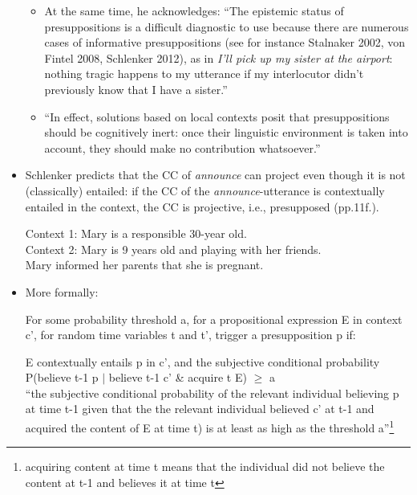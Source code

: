 \documentclass[11pt,fleqn]{article}
\newcommand{\6}{\mbox{$[\hspace*{-.6mm}[$}}
\newcommand{\9}{\mbox{$]\hspace*{-.6mm}]$}}
\begin{document}
\begin{itemize}
\begin{itemize}
\item At the same time, he acknowledges: ``The epistemic status of presuppositions is a difficult diagnostic to use because there are numerous cases of informative presuppositions (see for instance Stalnaker 2002, von Fintel 2008, Schlenker 2012), as in {\em I'll pick up my sister at the airport}: nothing tragic happens to my utterance if my interlocutor didn't previously know that I have a sister.''

\item ``In effect, solutions based on local contexts posit that presuppositions should be cognitively inert: once their linguistic environment is taken into account, they should make no contribution whatsoever.''

\end{itemize}

\item Schlenker predicts that the CC of {\em announce} can project even though it is not (classically) entailed: if the CC of the {\em announce}-utterance is contextually entailed in the context, the CC is projective, i.e., presupposed (pp.11f.). 

\begin{exe}
\ex Context 1: Mary is a responsible 30-year old.
\\ Context 2: Mary is 9 years old and playing with her friends.
\\ Mary informed her parents that she is pregnant.
\end{exe}

\item More formally:

\begin{exe}
  For some probability threshold a, for a propositional expression E in context c', for random time variables t and t', trigger a presupposition p if:
\begin{xlist}
\ex E contextually entails p in c', and
\ex the subjective conditional probability P(believe t-1 p $|$ believe t-1 c' \& acquire t E) $\geq$ a
\\ ``the subjective conditional probability of the relevant individual believing p at time t-1 given that the the relevant individual believed c' at t-1 and acquired the content of E at time t) is at least as high as the threshold a''\footnote{acquiring content at time t means that the individual did not believe the content at t-1 and believes it at time t}
\end{xlist}
\end{exe}


\end{itemize}
\end{document}
